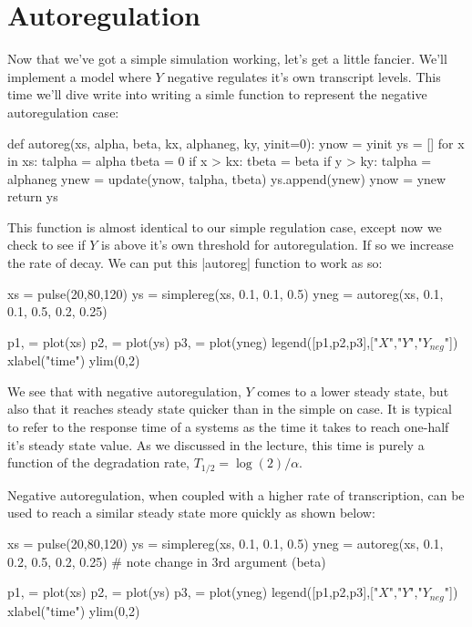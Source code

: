 \section{Autoregulation}

Now that we've got a simple simulation working, let's get a little fancier. We'll implement a model where $Y$ negative regulates it's own transcript levels. This time we'll dive write into writing a simle function to represent the negative autoregulation case:
%
\begin{python}
def autoreg(xs, alpha, beta, kx, alphaneg, ky, yinit=0):
    ynow = yinit
    ys = []
    for x in xs:
        talpha = alpha
        tbeta = 0
        if x > kx:
            tbeta = beta
        if y > ky:
            talpha = alphaneg
        ynew = update(ynow, talpha, tbeta)
        ys.append(ynew)
        ynow = ynew
    return ys
\end{python}
%
This function is almost identical to our simple regulation case, except now we check to see if $Y$ is above it's own threshold for autoregulation. If so we increase the rate of decay. We can put this |autoreg| function to work as so:
%
\begin{python}
xs = pulse(20,80,120)
ys = simplereg(xs, 0.1, 0.1, 0.5)
yneg = autoreg(xs, 0.1, 0.1, 0.5, 0.2, 0.25)

p1, = plot(xs)
p2, = plot(ys)
p3, = plot(yneg)
legend([p1,p2,p3],["$X$","$Y$","$Y_{neg}$"])
xlabel("time")
ylim(0,2)
\end{python}

We see that with negative autoregulation, $Y$ comes to a lower steady state, but also that it reaches steady state quicker than in the simple on case. It is typical to refer to the response time of a systems as the time it takes to reach one-half it's steady state value.  As we discussed in the lecture, this time is purely a function of the degradation rate, $T_{1/2} = \log(2)/\alpha$.

Negative autoregulation, when coupled with a higher rate of transcription, can be used to reach a similar steady state more quickly as shown below:
%
\begin{python}
xs = pulse(20,80,120)
ys = simplereg(xs, 0.1, 0.1, 0.5)
yneg = autoreg(xs, 0.1, 0.2, 0.5, 0.2, 0.25) # note change in 3rd argument (beta)

p1, = plot(xs)
p2, = plot(ys)
p3, = plot(yneg)
legend([p1,p2,p3],["$X$","$Y$","$Y_{neg}$"])
xlabel("time")
ylim(0,2)
\end{python}


